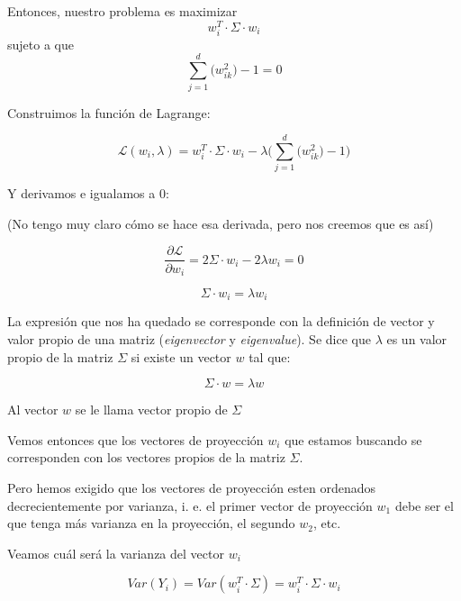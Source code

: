 \documentclass[a4paper,10pt]{article}
\begin{document}
Entonces, nuestro problema es maximizar
\begin{equation*}
    w_i^T \cdot \Sigma \cdot w_i
\end{equation*}
sujeto a que
\begin{equation*}
\sum_{j = 1}^d \big( w_{ik}^2 \big) -1 = 0
\end{equation*}

Construimos la función de Lagrange:

\begin{equation*}
  \mathcal{L}(w_i,\lambda) = w_i^T \cdot \Sigma \cdot w_i - \lambda \Big( \sum_{j = 1}^d \big( w_{ik}^2 \big) -1\Big)
\end{equation*}

Y derivamos e igualamos a 0:

(No tengo muy claro cómo se hace esa derivada, pero nos creemos que es así)

\begin{equation*}
  \frac{\partial \mathcal{L}}{\partial w_i} = 2\Sigma \cdot w_i - 2\lambda w_i = 0
\end{equation*}

\begin{equation*}
  \Sigma \cdot w_i = \lambda w_i
\end{equation*}

La expresión que nos ha quedado se corresponde con la definición de vector y valor propio de una matriz (\textit{eigenvector} y \textit{eigenvalue}). Se dice que $\lambda$ es un valor propio de la matriz $\Sigma$ si existe un vector $w$ tal que:

\begin{equation*}
  \Sigma \cdot w = \lambda w
\end{equation*}

Al vector $w$ se le llama vector propio de $\Sigma$

Vemos entonces que los vectores de proyección $w_i$ que estamos buscando se corresponden con los vectores propios de la matriz $\Sigma$.

Pero hemos exigido que los vectores de proyección esten ordenados decrecientemente por varianza, i. e. el primer vector de proyección $w_1$ debe ser el que tenga más varianza en la proyección, el segundo $w_2$, etc.

Veamos cuál será la varianza del vector $w_i$

\begin{equation*}
  Var(Y_i) = Var(w_i^T \cdot \Sigma) = w_i^T \cdot \Sigma \cdot w_i
\end{equation*}
\end{document}
